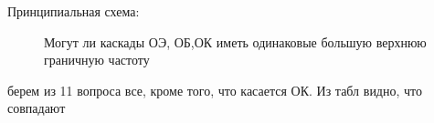 \documentclass[12pt,a4paper]{article}
\begin{document}
Принципиальная схема:
\begin{center}
        \begin{figure}[h!]
                \caption{Могут ли каскады ОЭ, ОБ,ОК иметь одинаковые большую верхнюю граничную частоту}
        \end{figure}
\end{center}

берем из 11 вопроса все, кроме того, что касается ОК. Из табл видно, что совпадают
\end{document}

